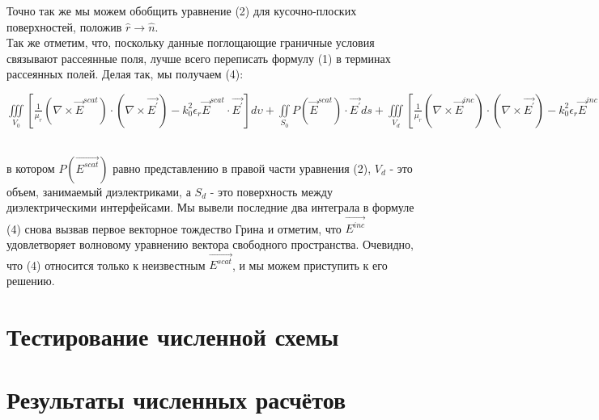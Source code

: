 Точно так же мы можем обобщить уравнение (2) для кусочно-плоских поверхностей, положив $ \hat{r} \rightarrow \hat{n} $.\\
Так же отметим, что, поскольку данные поглощающие граничные условия связывают рассеянные поля, лучше всего переписать формулу (1) в терминах рассеянных полей. Делая так, мы получаем (4): \\
\begin{center}
	$ \iiint\limits_{V_{0}}^{} \left[ \frac{1}{\mu_{r}}(\nabla \times \vec{E}^{scat}) \cdot (\nabla \times \vec{E^{'}}) - k_{0}^{2} \epsilon_{r}\vec{E}^{scat} \cdot \vec{E^{'}} \right]d\upsilon + 
	\iint\limits_{S_{0}}^{}  P(\vec{E}^{scat}) \cdot \vec{E^{'}}ds + 
	\iiint\limits_{V_{d}}^{} \left[ \frac{1}{\mu_{r}}(\nabla \times \vec{E}^{inc}) \cdot (\nabla \times \vec{E^{'}}) - k_{0}^{2} \epsilon_{r}\vec{E}^{inc} \cdot \vec{E^{'}} \right]d\upsilon + 
	jk_{0}Z_{0}\iint\limits_{S_{d}}^{} \frac{1}{\mu_{r}}(\hat{n} \times \vec{H}^{inc}) \cdot \vec{E^{'}}ds = 0, $
\end{center}\\
в котором $P(\vec{E^{scat}})$ равно представлению в правой части уравнения (2), $ V_{d} $ - это объем, занимаемый диэлектриками, а $ S_{d} $ - это поверхность между диэлектрическими интерфейсами. Мы вывели последние два интеграла в формуле (4) снова вызвав первое векторное тождество Грина и отметим, что $ \vec{E^{inc}} $ удовлетворяет волновому уравнению вектора свободного пространства. Очевидно, что (4) относится только к неизвестным $ \vec{E^{scat}} $, и мы можем приступить к его решению.
\section{Тестирование численной схемы}

\section{Результаты численных расчётов}


